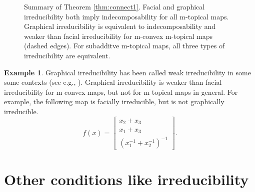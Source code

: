 \documentclass[10pt,reqno]{amsart}
\theoremstyle{plain}
\theoremstyle{definition}
\newtheorem{example}[theorem]{Example}
\numberwithin{equation}{section}
\begin{document}
\begin{figure}[h] \label{fig:irreducibility}
\begin{center}
\end{center}
\caption{Summary of Theorem \ref{thm:connect1}. Facial and graphical irreducibility both imply indecomposability for all m-topical maps. Graphical irreducibility is equivalent to indecomposability and weaker than facial irreducibility for m-convex m-topical maps (dashed edges). For subadditve m-topical maps, all three types of irreducibility are equivalent. }
\end{figure}

\begin{example}
Graphical irreducibility has been called weak irreducibility in some some contexts (see e.g., \cite{FriedlandGaubertHan13}).  Graphical irreducibility is weaker than facial irreducibility for m-convex maps, but not for m-topical maps in general.  For example, the following map is facially irreducible, but is not graphically irreducible.  
$$f(x) = \begin{bmatrix} x_2 + x_3 \\ x_1 + x_3 \\ (x_1^{-1} + x_2^{-1})^{-1} \end{bmatrix}.$$
\end{example}


\section{Other conditions like irreducibility} \label{sec:almost}
\end{document}
